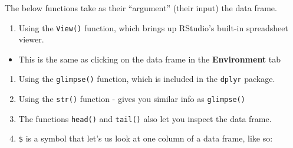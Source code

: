 \documentclass[]{book}
\newenvironment{Shaded}{\begin{snugshade}}{\end{snugshade}}
\newcommand{\NormalTok}[1]{#1}
\newcommand{\OperatorTok}[1]{\textcolor[rgb]{0.81,0.36,0.00}{\textbf{#1}}}
\providecommand{\tightlist}{%
  \setlength{\itemsep}{0pt}\setlength{\parskip}{0pt}}
\begin{document}
The below functions take as their ``argument'' (their input) the data frame.

\begin{enumerate}
\def\labelenumi{\arabic{enumi}.}
\tightlist
\item
  Using the \texttt{View()} function, which brings up RStudio's built-in spreadsheet viewer.
\end{enumerate}

\begin{itemize}
\tightlist
\item
  This is the same as clicking on the data frame in the \textbf{Environment} tab
\end{itemize}

\begin{enumerate}
\def\labelenumi{\arabic{enumi}.}
\tightlist
\item
  Using the \texttt{glimpse()} function, which is included in the \texttt{dplyr} package.
\item
  Using the \texttt{str()} function - gives you similar info as \texttt{glimpse()}
\item
  The functions \texttt{head()} and \texttt{tail()} also let you inspect the data frame.
\item
  \texttt{\$} is a symbol that let's us look at one column of a data frame, like so:
\end{enumerate}

\begin{Shaded}
\end{Shaded}
\end{document}
